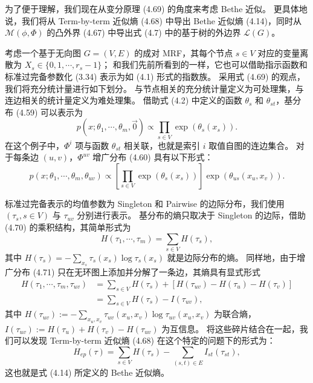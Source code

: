 \begin{tcolorbox}
\begin{exam}

为了便于理解，我们现在从变分原理 (4.69) 的角度来考虑 Bethe 近似。
更具体地说，我们将从 Term-by-term 近似熵 (4.68) 中导出 Bethe 近似熵 (4.14)，同时从 $\mathcal{M}(\phi, \Phi)$ 的凸外界 (4.67) 中导出式 (4.7) 中的基于树的外边界 $\mathcal{L}(G)$。

考虑一个基于无向图 $G = (V, E)$ 的成对 MRF，其每个节点 $s \in V$ 对应的变量离散为 $X_s \in \{0, 1, \cdots, r_s-1\}$；
和我们先前所看到的一样，它也可以借助指示函数和标准过完备参数化 (3.34) 表示为如 (4.1) 形式的指数族。
采用式 (4.69) 的观点，我们将充分统计量进行如下划分。
与节点相关的充分统计量定义为可处理集，与连边相关的统计量定义为难处理集。
借助式 (4.2) 中定义的函数 $\theta_s$ 和 $\theta_{st}$，基分布 (4.59) 可以表示为
\begin{equation}
    p(x; \theta_1, \cdots, \theta_m, \vec{0}) \propto \prod_{s \in V}\exp(\theta_s(x_s)).
\end{equation}
在这个例子中，$\Phi^i$ 项与函数 $\theta_{st}$ 相关联，也就是索引 $i$ 取值自图的连边集合。
对于每条边 $(u, v)$，$\Phi^{uv}$ 增广分布 (4.60) 具有以下形式：
\begin{equation}
    p(x; \theta_1, \cdots, \theta_m, \theta_{uv}) \propto [\prod_{s \in V}\exp(\theta_s(x_s))]\exp(\theta_{us}(x_u, x_v)).
\end{equation}

标准过完备表示的均值参数为 Singleton 和 Pairwise 的边际分布，我们使用 $(\tau_s, s \in V)$ 与 $\tau_{uv}$ 分别进行表示。
基分布的熵只取决于 Singleton 的边际，借助 (4.70) 的乘积结构，其简单形式为
\begin{equation*}
    H(\tau_1, \cdots, \tau_m) = \sum_{s \in V}H(\tau_s), 
\end{equation*}
其中 $H(\tau_s) = -\sum_{x_s}\tau_s(x_s)\log\tau_s(x_s)$ 就是边际分布的熵。
同样地，由于增广分布 (4.71) 只在无环图上添加并分解了一条边，其熵具有显式形式
\begin{align*}
    H(\tau_1, \cdots, \tau_m, \tau_{uv}) &= \sum_{s \in V}H(\tau_s) + [H(\tau_{uv}) - H(\tau_u) - H(\tau_v)] \\
    &= \sum_{s \in V}H(\tau_s) - I(\tau_{uv}), 
\end{align*}
其中 $H(\tau_{uv}) := -\sum_{x_u, x_v}\tau_{uv}(x_u, x_v)\log\tau_{uv}(x_u, x_v)$ 为联合熵，$I(\tau_{uv}) := H(\tau_u) + H(\tau_v) - H(\tau_{uv})$ 为互信息。
将这些碎片结合在一起，我们可以发现 Term-by-term 近似熵 (4.68) 在这个特定的问题下的形式为：
\begin{equation*}
    H_{ep}(\tau) = \sum_{s \in V}H(\tau_s) - \sum_{(s, t) \in E}I_{st}(\tau_{st}), 
\end{equation*}
这也就是式 (4.14) 所定义的 Bethe 近似熵。


\end{exam}
\end{tcolorbox}
